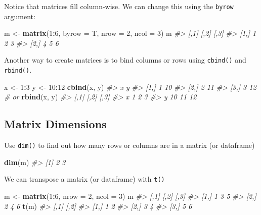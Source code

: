 \documentclass[]{book}
\newenvironment{Shaded}{\begin{snugshade}}{\end{snugshade}}
\newcommand{\CommentTok}[1]{\textcolor[rgb]{0.56,0.35,0.01}{\textit{#1}}}
\newcommand{\DataTypeTok}[1]{\textcolor[rgb]{0.13,0.29,0.53}{#1}}
\newcommand{\DecValTok}[1]{\textcolor[rgb]{0.00,0.00,0.81}{#1}}
\newcommand{\KeywordTok}[1]{\textcolor[rgb]{0.13,0.29,0.53}{\textbf{#1}}}
\newcommand{\NormalTok}[1]{#1}
\newcommand{\OperatorTok}[1]{\textcolor[rgb]{0.81,0.36,0.00}{\textbf{#1}}}
\newcommand{\StringTok}[1]{\textcolor[rgb]{0.31,0.60,0.02}{#1}}
\begin{document}
Notice that matrices fill column-wise. We can change this using the \texttt{byrow} argument:

\begin{Shaded}
\begin{Highlighting}[]
\NormalTok{m <-}\StringTok{ }\KeywordTok{matrix}\NormalTok{(}\DecValTok{1}\OperatorTok{:}\DecValTok{6}\NormalTok{, }\DataTypeTok{byrow =}\NormalTok{ T, }\DataTypeTok{nrow =} \DecValTok{2}\NormalTok{, }\DataTypeTok{ncol =} \DecValTok{3}\NormalTok{)}
\NormalTok{m}
\CommentTok{#>      [,1] [,2] [,3]}
\CommentTok{#> [1,]    1    2    3}
\CommentTok{#> [2,]    4    5    6}
\end{Highlighting}
\end{Shaded}

Another way to create matrices is to bind columns or rows using \texttt{cbind()} and \texttt{rbind()}.

\begin{Shaded}
\begin{Highlighting}[]
\NormalTok{x <-}\StringTok{ }\DecValTok{1}\OperatorTok{:}\DecValTok{3}
\NormalTok{y <-}\StringTok{ }\DecValTok{10}\OperatorTok{:}\DecValTok{12}
\KeywordTok{cbind}\NormalTok{(x, y)}
\CommentTok{#>      x  y}
\CommentTok{#> [1,] 1 10}
\CommentTok{#> [2,] 2 11}
\CommentTok{#> [3,] 3 12}
\CommentTok{# or }
\KeywordTok{rbind}\NormalTok{(x, y)}
\CommentTok{#>   [,1] [,2] [,3]}
\CommentTok{#> x    1    2    3}
\CommentTok{#> y   10   11   12}
\end{Highlighting}
\end{Shaded}

\hypertarget{matrix-dimensions}{%
\subsection{Matrix Dimensions}\label{matrix-dimensions}}

Use \texttt{dim()} to find out how many rows or columns are in a matrix (or dataframe)

\begin{Shaded}
\begin{Highlighting}[]
\KeywordTok{dim}\NormalTok{(m)}
\CommentTok{#> [1] 2 3}
\end{Highlighting}
\end{Shaded}

We can transpose a matrix (or dataframe) with \texttt{t()}

\begin{Shaded}
\begin{Highlighting}[]
\NormalTok{m <-}\StringTok{ }\KeywordTok{matrix}\NormalTok{(}\DecValTok{1}\OperatorTok{:}\DecValTok{6}\NormalTok{, }\DataTypeTok{nrow =} \DecValTok{2}\NormalTok{, }\DataTypeTok{ncol =} \DecValTok{3}\NormalTok{)}
\NormalTok{m}
\CommentTok{#>      [,1] [,2] [,3]}
\CommentTok{#> [1,]    1    3    5}
\CommentTok{#> [2,]    2    4    6}
\KeywordTok{t}\NormalTok{(m)}
\CommentTok{#>      [,1] [,2]}
\CommentTok{#> [1,]    1    2}
\CommentTok{#> [2,]    3    4}
\CommentTok{#> [3,]    5    6}
\end{Highlighting}
\end{Shaded}
\end{document}
